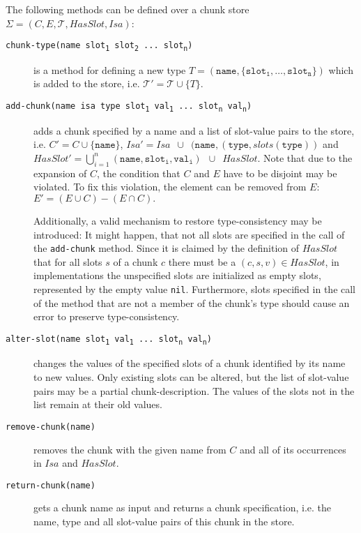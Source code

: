 \begin{definition}
\label{def:abstract_methods_chunk_store}
The following methods can be defined over a chunk store $\Sigma = (C, E, \mathcal{T}, HasSlot, Isa)$:

\begin{description}
 \item[\texttt{chunk-type(name slot\textsubscript{1} slot\textsubscript{2} ... slot\textsubscript{n})}] is a method for defining a new type $T = (\mathtt{name},\{\mathtt{slot_1}, \dots, \mathtt{slot_n}\})$ which is added to the store, i.e. $\mathcal{T'} = \mathcal{T} \cup \{T\}$. 
 \item[\texttt{add-chunk(name isa type slot\textsubscript{1} val\textsubscript{1} ... slot\textsubscript{n} val\textsubscript{n})}] adds a chunk specified by a name and a list of slot-value pairs to the store, i.e. $C' = C \cup \{ \mathtt{name} \}$, $Isa' = Isa \enspace \cup \enspace (\mathtt{name}, (\mathtt{type}, slots(\mathtt{type}))$ and $HasSlot' = \bigcup_{i = 1}^n{\mathtt{(name,slot_i,val_i)}} \enspace \cup \enspace HasSlot.$ Note that due to the expansion of $C$, the condition that $C$ and $E$ have to be disjoint may be violated. To fix this violation, the element can be removed from $E$: $E' = (E \cup C) - (E \cap C).$ 
 
 Additionally, a valid mechanism to restore type-consistency may be introduced: It might happen, that not all slots are specified in the call of the \lstinline|add-chunk| method. Since it is claimed by the definition of $HasSlot$ that for all slots $s$ of a chunk $c$ there must be a $(c,s,v) \in HasSlot$, in implementations the unspecified slots are initialized as empty slots, represented by the empty value \lstinline|nil|. Furthermore, slots specified in the call of the method that are not a member of the chunk's type should cause an error to preserve type-consistency.
  \item[\texttt{alter-slot(name slot\textsubscript{1} val\textsubscript{1} ... slot\textsubscript{n} val\textsubscript{n})}] changes the values of the specified slots of a chunk identified by its name to new values. Only existing slots can be altered, but the list of slot-value pairs may be a partial chunk-description. The values of the slots not in the list remain at their old values.
  \item[\texttt{remove-chunk(name)}] removes the chunk with the given name from $C$ and all of its occurrences in $Isa$ and $HasSlot$.
  \item[\texttt{return-chunk(name)}] gets a chunk name as input and returns a chunk specification, i.e. the name, type and all slot-value pairs of this chunk in the store.
\end{description} 
\end{definition}

